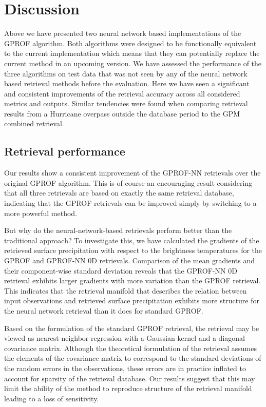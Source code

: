 \documentclass[a4paper,11pt,bibtotoc]{scrartcl}
\begin{document}
\section{Discussion}

Above we have presented two neural network based implementations of the GPROF
algorithm. Both algorithms were designed to be functionally equivalent to the
current implementation which means that they can potentially replace the current
method in an upcoming version. We have assessed the performance of the three
algorithms on test data that was not seen by any of the neural network based
retrieval methods before the evaluation. Here we have seen a significant and
consistent improvements of the retrieval accuracy across all considered metrics
and outputs. Similar tendencies were found when comparing retrieval results from
a Hurricane overpass outside the database period to the GPM combined retrieval.

\subsection{Retrieval performance}

Our results show a consistent improvement of the GPROF-NN retrievals over the
original GPROF algorithm. This is of course an encouraging result considering
that all three retrievals are based on exactly the same retrieval database,
indicating that the GPROF retrievals can be improved simply by switching to a
more powerful method.

But why do the neural-network-based retrievals perform better than the
traditional approach? To investigate this, we have calculated the gradients of
the retrieved surface precipitation with respect to the brightness temperatures
for the GPROF and GPROF-NN 0D retrievals. Comparison of the mean gradients and
their component-wise standard deviation reveals that the GPROF-NN 0D retrieval
exhibits larger gradients with more variation than the GPROF retrieval. This
indicates that the retrieval manifold that describes the relation between input
observations and retrieved surface precipitation exhibits more structure for the
neural network retrieval than it does for standard GPROF.

Based on the formulation of the standard GPROF retrieval, the retrieval may be
viewed as nearest-neighbor regression with a Gaussian kernel and a diagonal
covariance matrix. Although the theoretical formulation of the retrieval assumes
the elements of the covariance matrix to correspond to the standard deviations
of the random errors in the observations, these errors are in practice inflated
to account for sparsity of the retrieval database. Our results suggest that this
may limit the ability of the method to reproduce structure of the retrieval
manifold leading to a loss of sensitivity.
\end{document}
